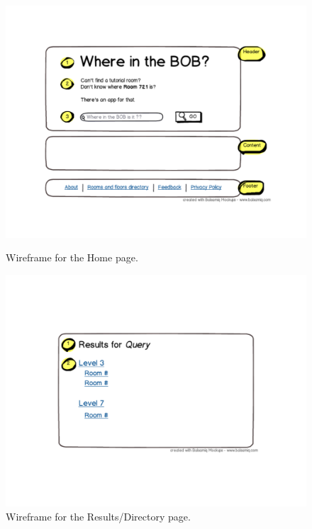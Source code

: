 \begin{figure}
\begin{minipage}[b]{0.5\linewidth}\centering
                \includegraphics[scale=0.35]{img/wireframes/home.pdf}
                \caption{Wireframe for the Home page.}
                \label{img:wireframes-home}
\end{minipage}
\hspace{4cm}
\begin{minipage}[b]{0.5\linewidth}\centering
                \includegraphics[scale=0.35]{img/wireframes/results.pdf}
                \caption{Wireframe for the Results/Directory page.}
                \label{img:wireframes-results}
\end{minipage}
\end{figure}


